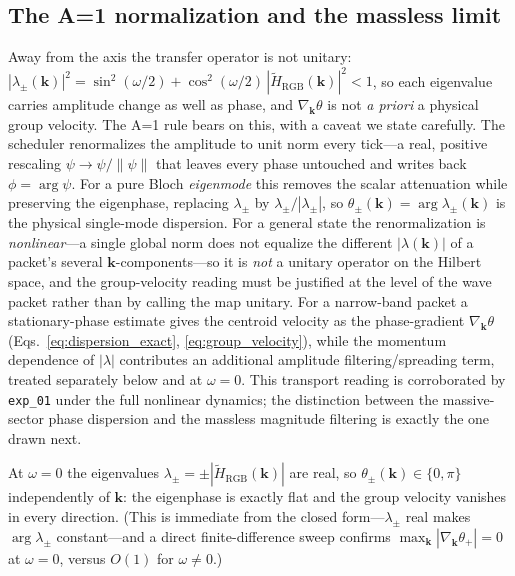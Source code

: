 \subsection{The A=1 normalization and the massless limit}
\label{subsec:a1_normalization}

Away from the axis the transfer operator is not unitary:
$|\lambda_\pm(\mathbf{k})|^2 = \sin^2(\omega/2) + \cos^2(\omega/2)\,
|\tilde H_\text{RGB}(\mathbf{k})|^2 < 1$, so each eigenvalue carries amplitude
change as well as phase, and $\nabla_{\mathbf{k}}\theta$ is not \emph{a priori} a
physical group velocity. The A=1 rule bears on this, with a caveat we state carefully.
The scheduler renormalizes the amplitude to unit norm every tick---a real, positive
rescaling $\psi\to\psi/\|\psi\|$ that leaves every phase untouched and writes back
$\phi=\arg\psi$. For a pure Bloch \emph{eigenmode} this removes the scalar attenuation
while preserving the eigenphase, replacing $\lambda_\pm$ by
$\lambda_\pm/|\lambda_\pm|$, so $\theta_\pm(\mathbf{k}) = \arg\lambda_\pm(\mathbf{k})$
is the physical single-mode dispersion. For a general state the renormalization is
\emph{nonlinear}---a single global norm does not equalize the different $|\lambda(\mathbf{k})|$
of a packet's several $\mathbf{k}$-components---so it is \emph{not} a unitary operator on
the Hilbert space, and the group-velocity reading must be justified at the level of the
wave packet rather than by calling the map unitary. For a narrow-band packet a
stationary-phase estimate gives the centroid velocity as the phase-gradient
$\nabla_{\mathbf{k}}\theta$ (Eqs.~\eqref{eq:dispersion_exact},
\eqref{eq:group_velocity}), while the momentum dependence of $|\lambda|$ contributes an
additional amplitude filtering/spreading term, treated separately below and at $\omega=0$.
This transport reading is corroborated by \texttt{exp\_01} under the full nonlinear
dynamics; the distinction between the massive-sector phase dispersion and the massless
magnitude filtering is exactly the one drawn next.

\begin{proposition}
\label{prop:massless_flat}
At $\omega=0$ the eigenvalues $\lambda_\pm = \pm|\tilde H_\text{RGB}(\mathbf{k})|$ are
real, so $\theta_\pm(\mathbf{k}) \in \{0,\pi\}$ independently of $\mathbf{k}$: the
eigenphase is exactly flat and the group velocity vanishes in every direction. (This
is immediate from the closed form---$\lambda_\pm$ real makes $\arg\lambda_\pm$
constant---and a direct finite-difference sweep confirms
$\max_{\mathbf{k}}|\nabla_{\mathbf{k}}\theta_+| = 0$ at $\omega=0$, versus $O(1)$ for
$\omega\neq0$.)
\end{proposition}


